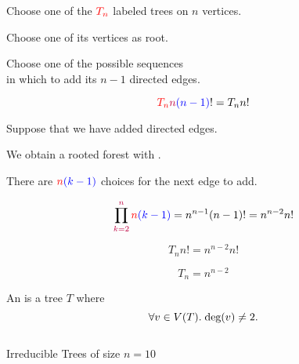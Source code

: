 \begin{frame}{}
  \begin{center}
    Choose one of the $\textcolor{red}{T_{n}}$ labeled trees on $n$ vertices.

    \pause
    \vspace{0.60cm}
    Choose one of its  vertices as root.

    \pause
    \vspace{0.60cm}
    Choose one of the  possible sequences \\
    in which to add its $n-1$ directed edges.
  \end{center}

  \[
    \textcolor{red}{T_n} \textcolor{purple}{n}\textcolor{blue}{(n-1)}! = T_n n!
  \]
\end{frame}

\begin{frame}{}
  \begin{center}
    Suppose that we have added  directed edges.

    \pause
    \vspace{0.30cm}
    We obtain a rooted forest with .

    \pause
    \vspace{0.30cm}
    There are $\textcolor{red}{n}\textcolor{blue}{(k-1)}$ choices for the next edge to add.
  \end{center}

  \pause

  \pause
  \[
    \prod_{\textcolor{purple}{k=2}}^{\textcolor{purple}{n}} \textcolor{red}{n}\textcolor{blue}{(k-1)}
      = n^{n-1} (n-1)! = n^{n-2} n!
  \]
\end{frame}

\begin{frame}{}
  \[
    T_n n! = n^{n-2}n!
  \]

  \pause
  \[
    T_{n} = n^{n-2}
  \]

  \pause
\end{frame}

\begin{frame}{}
  \begin{definition}
    An  is a tree $T$ where
    \[
      \forall v \in V(T).\; \text{deg}(v) \neq 2.
    \]
  \end{definition}

  \pause
  \vspace{0.30cm}
  \begin{columns}
      \pause
  \end{columns}

  \pause
  \vspace{0.30cm}
  \begin{center}
     Irreducible Trees of size $n = 10$
  \end{center}
\end{frame}
